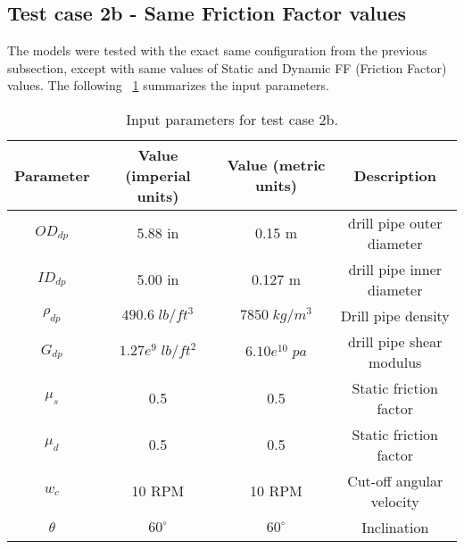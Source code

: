 \subsection{Test case 2b - Same Friction Factor values}

The models were tested with the exact same configuration from the previous subsection, except with same values of Static and Dynamic FF (Friction Factor) values. The following \tablename~\ref{table_Inclinedwell_2b_input} summarizes the input parameters. 

\begin{table}[!hbt]
  \centering
  \begin{tabular}{|c|c|c|c|}
  \hline
  Parameter & Value (imperial units) & Value (metric units) & Description\\                                                              
  \hline
  $OD_{dp}$ & 5.88 in & 0.15 m & drill pipe outer diameter\\                                                       
  \hline
  $ID_{dp}$ & 5.00 in & 0.127 m & drill pipe inner diameter  \\                                                      
  \hline
  $\rho_{dp}$ & $490.6\;lb/ft^3$ & $7850\;kg/m^3$ & Drill pipe density \\                                                  
  \hline
  $G_{dp}$ & $1.27e^{9}\;lb/ft^2$ & $6.10e^{10}\;pa$ & drill pipe shear modulus\\                                                              
  \hline
  $\mu_{s}$ & 0.5 & 0.5 & Static friction factor\\
  \hline
  $\mu_{d}$ & 0.5 & 0.5 & Static friction factor\\
  \hline
  $w_c$ & 10 RPM & 10 RPM & Cut-off angular velocity\\
  \hline
  $\theta$ & $60^{\circ}$ & $60^{\circ}$ & Inclination\\
  \hline
  \end{tabular}
\caption[Input parameters for test case 2b.]{Input parameters for test case 2b.}\label{table_Inclinedwell_2b_input}
\end{table}

